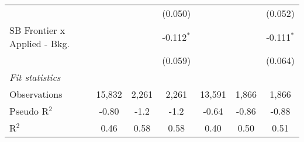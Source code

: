 \begin{tabular}{lcccccc}
                                  &             &               & (0.050)        &              &               & (0.052)\\   
   SB Frontier x Applied - Bkg.   &             &               & -0.112$^{*}$   &              &               & -0.111$^{*}$\\   
                                  &             &               & (0.059)        &              &               & (0.064)\\   
   \midrule
   \emph{Fit statistics}\\
   Observations                   & 15,832      & 2,261         & 2,261          & 13,591       & 1,866         & 1,866\\  
   Pseudo R$^2$                   & -0.80       & -1.2          & -1.2           & -0.64        & -0.86         & -0.88\\  
   R$^2$                          & 0.46        & 0.58          & 0.58           & 0.40         & 0.50          & 0.51\\  
   

\end{tabular}

